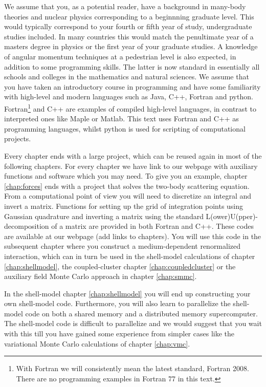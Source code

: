 We assume that you, as a potential reader, have a background in
many-body theories and nuclear physics corresponding to a beginnning
graduate level. This would typically correspond to your fourth or
fifth year of study, undergraduate studies included. In many countries
this would match the penultimate year of a masters degree in physics
or the first year of your graduate studies.  A knowledge of angular
momentum techniques at a pedestrian level is also expected, in
addition to some programming skills. The latter is now standard in
essentially all schools and colleges in the mathematics and natural
sciences.  We assume that you have taken an introductory course in
programming and have some familiarity with high-level and modern
languages such as Java, C++, Fortran and python. Fortran\footnote{With
  Fortran we will consistently mean the latest standard, Fortran 2008.
  There are no programming examples in Fortran 77 in this text.}  and
C++ are examples of compiled high-level languages, in contrast to
interpreted ones like Maple or Matlab.  This text uses Fortran and C++
as programming languages, whilst python is used for scripting of
computational projects.


Every chapter ends with a large project, which can be reused again in
most of the following chapters.  For every chapter we have link to our
webpage with auxiliary functions and software which you may need.  To
give you an example, chapter \ref{chap:forces} ends with a project
that solves the two-body scattering equation.  From a computational
point of view you will need to discretize an integral and invert a
matrix.  Functions for setting up the grid of integration points using
Gaussian quadrature and inverting a matrix using the standard
L(ower)U(pper)-decomposition of a matrix are provided in both Fortran
and C++.  These codes are available at our webpage (add links to
chapters).  You will use this code in the subsequent chapter where you
construct a medium-dependent renormalized interaction, which can in
turn be used in the shell-model calculations of chapter
\ref{chap:shellmodel}, the coupled-cluster chapter
\ref{chap:coupledcluster} or the auxiliary field Monte Carlo approach
in chapter \ref{chap:smmc}.

In the shell-model chapter \ref{chap:shellmodel} you will end up
constructing your own shell-model code.  Furthermore, you will also
learn to parallelize the shell-model code on both a shared memory and
a distributed memory supercomputer. The shell-model code is difficult
to parallelize and we would suggest that you wait with this till you
have gained some experience from simpler cases like the variational
Monte Carlo calculations of chapter \ref{chap:vmc}.
 
